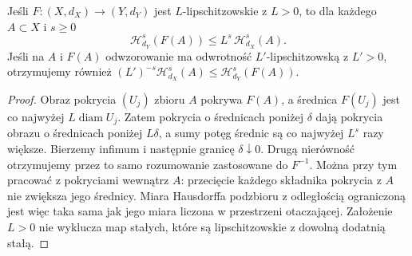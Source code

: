 \begin{lemat}
\label{lem:hausdorff-lipschitz}
Jeśli $F:(X,d_X)\to(Y,d_Y)$ jest
$L$-lipschitzowskie z $L>0$, to dla każdego $A\subset X$
i $s\geq0$
\[
 \mathcal H^s_{d_Y}(F(A))
 \leq L^s\,\mathcal H^s_{d_X}(A).
\]
Jeśli na $A$ i $F(A)$ odwzorowanie ma odwrotność
$L'$-lipschitzowską z $L'>0$, otrzymujemy również
$(L')^{-s}\mathcal H^s_{d_X}(A)
\leq\mathcal H^s_{d_Y}(F(A))$.
\end{lemat}
\begin{proof}
Obraz pokrycia $(U_j)$ zbioru $A$ pokrywa $F(A)$,
a średnica $F(U_j)$ jest co najwyżej
$L\operatorname{diam}U_j$.
Zatem pokrycia o średnicach poniżej
$\delta$ dają pokrycia obrazu o średnicach
poniżej $L\delta$, a sumy potęg średnic
są co najwyżej $L^s$ razy większe.
Bierzemy infimum i następnie granicę
$\delta\downarrow0$. Drugą nierówność
otrzymujemy przez to samo rozumowanie
zastosowane do $F^{-1}$. Można przy tym pracować
z pokryciami wewnątrz $A$: przecięcie każdego składnika
pokrycia z $A$ nie zwiększa jego średnicy. Miara
Hausdorffa podzbioru z odległością ograniczoną jest
więc taka sama jak jego miara liczona w przestrzeni
otaczającej. Założenie $L>0$ nie wyklucza map stałych,
które są lipschitzowskie z dowolną dodatnią stałą.
\end{proof}

